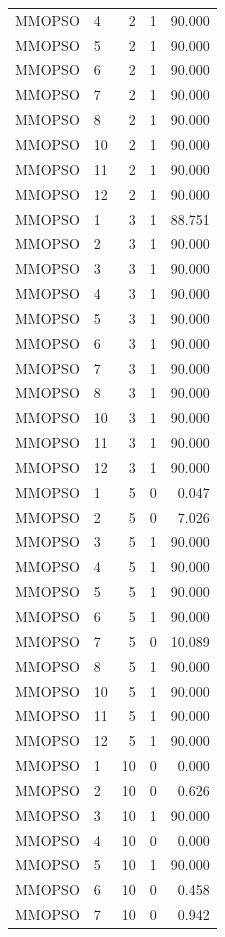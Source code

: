 \begin{longtable}{llrrr}
MMOPSO & 4 & 2 & 1 & 90.000 \\
MMOPSO & 5 & 2 & 1 & 90.000 \\
MMOPSO & 6 & 2 & 1 & 90.000 \\
MMOPSO & 7 & 2 & 1 & 90.000 \\
MMOPSO & 8 & 2 & 1 & 90.000 \\
MMOPSO & 10 & 2 & 1 & 90.000 \\
MMOPSO & 11 & 2 & 1 & 90.000 \\
MMOPSO & 12 & 2 & 1 & 90.000 \\
MMOPSO & 1 & 3 & 1 & 88.751 \\
MMOPSO & 2 & 3 & 1 & 90.000 \\
MMOPSO & 3 & 3 & 1 & 90.000 \\
MMOPSO & 4 & 3 & 1 & 90.000 \\
MMOPSO & 5 & 3 & 1 & 90.000 \\
MMOPSO & 6 & 3 & 1 & 90.000 \\
MMOPSO & 7 & 3 & 1 & 90.000 \\
MMOPSO & 8 & 3 & 1 & 90.000 \\
MMOPSO & 10 & 3 & 1 & 90.000 \\
MMOPSO & 11 & 3 & 1 & 90.000 \\
MMOPSO & 12 & 3 & 1 & 90.000 \\
MMOPSO & 1 & 5 & 0 & 0.047 \\
MMOPSO & 2 & 5 & 0 & 7.026 \\
MMOPSO & 3 & 5 & 1 & 90.000 \\
MMOPSO & 4 & 5 & 1 & 90.000 \\
MMOPSO & 5 & 5 & 1 & 90.000 \\
MMOPSO & 6 & 5 & 1 & 90.000 \\
MMOPSO & 7 & 5 & 0 & 10.089 \\
MMOPSO & 8 & 5 & 1 & 90.000 \\
MMOPSO & 10 & 5 & 1 & 90.000 \\
MMOPSO & 11 & 5 & 1 & 90.000 \\
MMOPSO & 12 & 5 & 1 & 90.000 \\
MMOPSO & 1 & 10 & 0 & 0.000 \\
MMOPSO & 2 & 10 & 0 & 0.626 \\
MMOPSO & 3 & 10 & 1 & 90.000 \\
MMOPSO & 4 & 10 & 0 & 0.000 \\
MMOPSO & 5 & 10 & 1 & 90.000 \\
MMOPSO & 6 & 10 & 0 & 0.458 \\
MMOPSO & 7 & 10 & 0 & 0.942 \\

\end{longtable}
